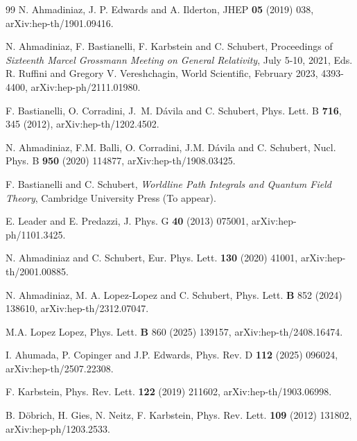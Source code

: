 \documentclass[a4paper,11pt]{article}
\begin{document}
\begin{thebibliography}{99}
N. Ahmadiniaz, J. P. Edwards and A. Ilderton, %
JHEP {\bf 05} (2019) 038, arXiv:hep-th/1901.09416.
 
N. Ahmadiniaz, F. Bastianelli, F. Karbstein and C. Schubert,
Proceedings of {\sl Sixteenth Marcel Grossmann Meeting on General Relativity}, 
July 5-10, 2021, 
Eds. R. Ruffini and Gregory V. Vereshchagin, World Scientific, February 2023, 4393-4400, arXiv:hep-ph/2111.01980. 


F. Bastianelli, O. Corradini, J.~M. D\'avila and C. Schubert, 
Phys. Lett. B {\bf 716}, 345 (2012), arXiv:hep-th/1202.4502.


N. Ahmadiniaz, F.M. Balli, O. Corradini, J.M. D\'avila and C. Schubert,
Nucl. Phys. B {\bf 950} (2020) 114877, 
arXiv:hep-th/1908.03425.

F. Bastianelli and C. Schubert, \textit{Worldline Path Integrals
and Quantum Field Theory}, Cambridge University Press (To appear).

E. Leader and E. Predazzi,
J. Phys. G {\bf 40} (2013) 075001, arXiv:hep-ph/1101.3425.

N. Ahmadiniaz and C. Schubert,
Eur. Phys. Lett. {\bf 130} (2020) 41001, arXiv:hep-th/2001.00885.


N. Ahmadiniaz, M. A. Lopez-Lopez and C. Schubert,
Phys. Lett. {\bf B} 852 (2024) 138610, arXiv:hep-th/2312.07047.

M.A. Lopez Lopez, Phys. Lett. {\bf B} 860 (2025) 139157, arXiv:hep-th/2408.16474. 

I. Ahumada, P. Copinger and J.P. Edwards,
Phys. Rev. D {\bf112} (2025) 096024, arXiv:hep-th/2507.22308.

F. Karbstein, %
Phys. Rev. Lett. {\bf122} (2019) 211602, arXiv:hep-th/1903.06998. 

B. Döbrich, H. Gies, N. Neitz, F. Karbstein, %
Phys. Rev. Lett. {\bf109} (2012) 131802, arXiv:hep-ph/1203.2533. 




\end{thebibliography}
\end{document}
